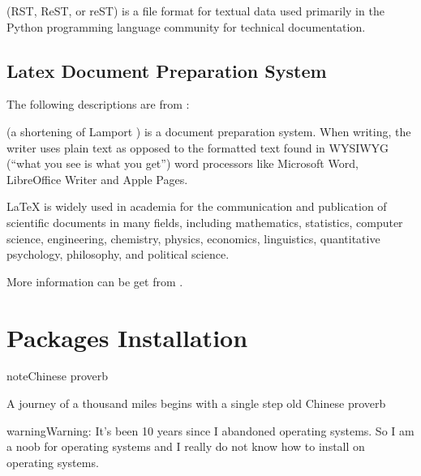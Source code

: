 \documentclass[letterpaper,11pt,english]{sphinxmanual}
\begin{document}
 (RST, ReST, or reST) is a file format for textual data used primarily in the Python programming language community for technical documentation.


\section{Latex Document Preparation System}
\label{\detokenize{intro:latex-document-preparation-system}}
The following descriptions are from :

 (a shortening of Lamport ) is a document preparation system. When writing, the writer uses plain text as opposed to the formatted text found in WYSIWYG (“what you see is what you get”) word processors like Microsoft Word, LibreOffice Writer and Apple Pages.

LaTeX is widely used in academia for the communication and publication of scientific documents in many fields, including mathematics, statistics, computer science, engineering, chemistry, physics, economics, linguistics, quantitative psychology, philosophy, and political science.

More information can be get from  .


\chapter{Packages Installation}
\label{\detokenize{pkgs:packages-installation}}\label{\detokenize{pkgs:pkgs}}\label{\detokenize{pkgs::doc}}
\begin{sphinxadmonition}{note}{Chinese proverb}

A journey of a thousand miles begins with a single step \textendash{} old Chinese proverb
\end{sphinxadmonition}

\begin{sphinxadmonition}{warning}{Warning:}
It’s been 10 years since I abandoned  operating systems. So I am a noob for  operating systems and I really do not know how to install  on  operating systems.
\end{sphinxadmonition}
\end{document}
